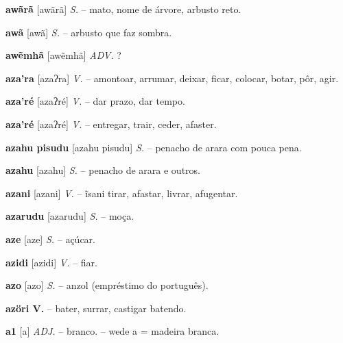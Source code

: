 \textbf{awãrã} [awãrã] \textit{S.} -- mato, nome de árvore, arbusto reto.

\textbf{awã} [awã] \textit{S.} -- arbusto que faz sombra.

\textbf{awẽmhã} [awẽmhã] \textit{ADV.} ?

\textbf{aza'ra} [azaʔra] \textit{V.} -- amontoar, arrumar, deixar, ficar, colocar, botar, pôr, agir.

\textbf{aza'ré} [azaʔré] \textit{V.} -- dar prazo, dar tempo.

\textbf{aza'ré} [azaʔré] \textit{V.} -- entregar, trair, ceder, afaster.

\textbf{azahu pisudu} [azahu pisudu] \textit{S.} -- penacho de arara com pouca pena.

\textbf{azahu} [azahu] \textit{S.} -- penacho de arara e outros.

\textbf{azani} [azani] \textit{V.} -- ĩsani tirar, afastar, livrar, afugentar.

\textbf{azarudu} [azarudu] \textit{S.} -- moça.

\textbf{aze} [aze] \textit{S.} -- açúcar.

\textbf{azidi} [azidi] \textit{V.} -- fiar.

\textbf{azo} [azo] \textit{S.} -- anzol (empréstimo do português).

\textbf{azöri V.} -- bater, surrar, castigar batendo.

\textbf{a1} [a] \textit{ADJ.} -- branco. -- wede a = madeira branca.

